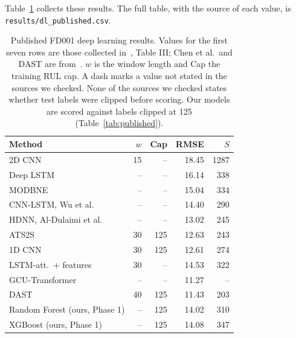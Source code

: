 Table~\ref{tab:dl-published} collects these results. The full table, with
the source of each value, is \texttt{results/dl\_published.csv}.

\begin{table}[t]
\centering
\caption{Published FD001 deep learning results. Values for the first seven
rows are those collected in~\cite{ragab2020attention}, Table III; Chen et
al.\ and DAST are from~\cite{zhang2022dast}. $w$ is the window length and
Cap the training RUL cap. A dash marks a value not stated in the sources we
checked. None of the sources we checked states whether test labels were
clipped before scoring. Our models are scored against labels clipped at 125
(Table~\ref{tab:published}).}
\label{tab:dl-published}
\footnotesize
\begin{tabular}{lrrrr}
\hline
Method & $w$ & Cap & RMSE & $S$ \\
\hline
2D CNN \cite{babu2016cnn}           & 15 & --  & 18.45 & 1287 \\
Deep LSTM \cite{zheng2017lstm}      & -- & --  & 16.14 & 338 \\
MODBNE \cite{zhang2017modbne}       & -- & --  & 15.04 & 334 \\
CNN-LSTM, Wu et al.                 & -- & --  & 14.40 & 290 \\
HDNN, Al-Dulaimi et al.             & -- & --  & 13.02 & 245 \\
ATS2S \cite{ragab2020attention}     & 30 & 125 & 12.63 & 243 \\
1D CNN \cite{li2018dcnn}            & 30 & 125 & 12.61 & 274 \\
\hline
LSTM-att.\ + features \cite{chen2021attention} & 30 & -- & 14.53 & 322 \\
GCU-Transformer \cite{mo2021gcu}    & -- & --  & 11.27 & -- \\
DAST \cite{zhang2022dast}           & 40 & 125 & 11.43 & 203 \\
\hline
Random Forest (ours, Phase 1)       & -- & 125 & 14.02 & 310 \\
XGBoost (ours, Phase 1)             & -- & 125 & 14.08 & 347 \\
\hline
\end{tabular}
\end{table}


